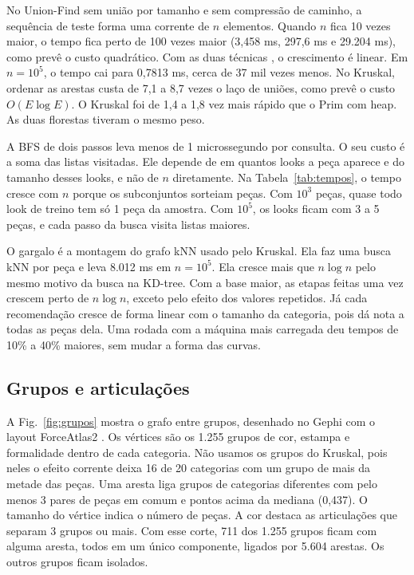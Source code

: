 \documentclass[conference]{IEEEtran}
\begin{document}
No Union-Find sem união por tamanho e sem compressão de caminho, a sequência de teste forma uma corrente de $n$ elementos. Quando $n$ fica 10 vezes maior, o tempo fica perto de 100 vezes maior (3,458 ms, 297,6 ms e 29.204 ms), como prevê o custo quadrático. Com as duas técnicas \cite{galler1964,tarjan1975}, o crescimento é linear. Em $n = 10^5$, o tempo cai para 0,7813 ms, cerca de 37 mil vezes menos. No Kruskal, ordenar as arestas custa de 7,1 a 8,7 vezes o laço de uniões, como prevê o custo $O(E \log E)$. O Kruskal foi de 1,4 a 1,8 vez mais rápido que o Prim com heap. As duas florestas tiveram o mesmo peso.

A BFS de dois passos leva menos de 1 microssegundo por consulta. O seu custo é a soma das listas visitadas. Ele depende de em quantos looks a peça aparece e do tamanho desses looks, e não de $n$ diretamente. Na Tabela~\ref{tab:tempos}, o tempo cresce com $n$ porque os subconjuntos sorteiam peças. Com $10^3$ peças, quase todo look de treino tem só 1 peça da amostra. Com $10^5$, os looks ficam com 3 a 5 peças, e cada passo da busca visita listas maiores.

O gargalo é a montagem do grafo kNN usado pelo Kruskal. Ela faz uma busca kNN por peça e leva 8.012 ms em $n = 10^5$. Ela cresce mais que $n \log n$ pelo mesmo motivo da busca na KD-tree. Com a base maior, as etapas feitas uma vez crescem perto de $n \log n$, exceto pelo efeito dos valores repetidos. Já cada recomendação cresce de forma linear com o tamanho da categoria, pois dá nota a todas as peças dela. Uma rodada com a máquina mais carregada deu tempos de 10\% a 40\% maiores, sem mudar a forma das curvas.

\subsection{Grupos e articulações}

A Fig.~\ref{fig:grupos} mostra o grafo entre grupos, desenhado no Gephi \cite{bastian2009} com o layout ForceAtlas2 \cite{jacomy2014}. Os vértices são os 1.255 grupos de cor, estampa e formalidade dentro de cada categoria. Não usamos os grupos do Kruskal, pois neles o efeito corrente deixa 16 de 20 categorias com um grupo de mais da metade das peças. Uma aresta liga grupos de categorias diferentes com pelo menos 3 pares de peças em comum e pontos acima da mediana (0,437). O tamanho do vértice indica o número de peças. A cor destaca as articulações que separam 3 grupos ou mais. Com esse corte, 711 dos 1.255 grupos ficam com alguma aresta, todos em um único componente, ligados por 5.604 arestas. Os outros grupos ficam isolados.
\end{document}
